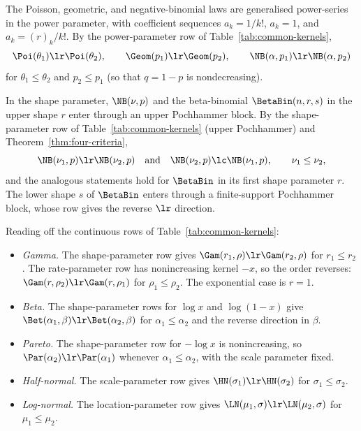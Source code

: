 \documentclass[11pt]{article}
\begin{document}
\begin{example}
\label{ex:standard-discrete}
The Poisson, geometric, and negative-binomial laws are generalised power-series in the power parameter, with coefficient sequences \(a_k=1/k!\), \(a_k=1\), and \(a_k=(r)_k/k!\). By the power-parameter row of Table~\ref{tab:common-kernels},
\[
\Poi(\theta_1)\lr\Poi(\theta_2), \qquad \Geom(p_1)\lr\Geom(p_2), \qquad \NB(\alpha,p_1)\lr\NB(\alpha,p_2)
\]
for $\theta_1\le\theta_2$ and $p_2\le p_1$ (so that \(q=1-p\) is nondecreasing).

In the shape parameter, $\NB(\nu,p)$ and the beta-binomial $\BetaBin(n,r,s)$ in the upper shape \(r\) enter through an upper Pochhammer block. By the shape-parameter row of Table~\ref{tab:common-kernels} (upper Pochhammer) and Theorem~\ref{thm:four-criteria},
\[
\NB(\nu_1,p)\lr\NB(\nu_2,p)
\quad\text{and}\quad
\NB(\nu_2,p)\lc\NB(\nu_1,p),
\qquad \nu_1\le\nu_2,
\]
and the analogous statements hold for $\BetaBin$ in its first shape parameter $r$. The lower shape \(s\) of $\BetaBin$ enters through a finite-support Pochhammer block, whose row gives the reverse \(\lr\) direction.
\end{example}
\begin{example}
\label{ex:standard-continuous}
Reading off the continuous rows of Table~\ref{tab:common-kernels}:
\begin{itemize}
\item \emph{Gamma.} The shape-parameter row gives \(\Gam(r_1,\rho)\lr\Gam(r_2,\rho)\) for \(r_1\le r_2\). The rate-parameter row has nonincreasing kernel \(-x\), so the order reverses: \(\Gam(r,\rho_2)\lr\Gam(r,\rho_1)\) for \(\rho_1\le\rho_2\). The exponential case is \(r=1\).

\item \emph{Beta.} The shape-parameter rows for \(\log x\) and \(\log(1-x)\) give \(\Bet(\alpha_1,\beta)\lr\Bet(\alpha_2,\beta)\) for \(\alpha_1\le\alpha_2\) and the reverse direction in \(\beta\).

\item \emph{Pareto.} The shape-parameter row for \(-\log x\) is nonincreasing, so \(\Par(\alpha_2)\lr\Par(\alpha_1)\) whenever \(\alpha_1\le\alpha_2\), with the scale parameter fixed.

\item \emph{Half-normal.} The scale-parameter row gives \(\HN(\sigma_1)\lr\HN(\sigma_2)\) for \(\sigma_1\le\sigma_2\).

\item \emph{Log-normal.} The location-parameter row gives \(\LN(\mu_1,\sigma)\lr\LN(\mu_2,\sigma)\) for \(\mu_1\le\mu_2\).
\end{itemize}
\end{example}
\end{document}
